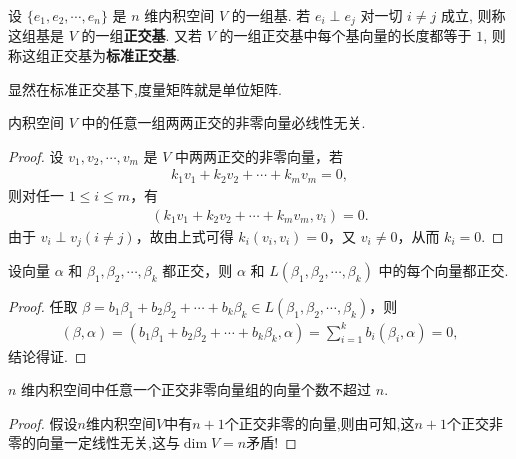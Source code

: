 \documentclass[../../main.tex]{subfiles}%
\begin{document}
\begin{definition}
设 $\{e_1, e_2, \cdots, e_n\}$ 是 $n$ 维内积空间 $V$ 的一组基. 若 $e_i \perp e_j$ 对一切 $i \neq j$ 成立, 则称这组基是 $V$ 的一组\textbf{正交基}. 又若 $V$ 的一组正交基中每个基向量的长度都等于 $1$, 则称这组正交基为\textbf{标准正交基}.
\end{definition}
\begin{note}
显然在标准正交基下,度量矩阵就是单位矩阵.
\end{note}

\begin{lemma}\label{lemma:正交向量组必线性无关}
内积空间 $V$ 中的任意一组两两正交的非零向量必线性无关.
\end{lemma}
\begin{proof}

设 $v_1, v_2, \cdots, v_m$ 是 $V$ 中两两正交的非零向量，若
\begin{align*}
k_1v_1 + k_2v_2 + \cdots + k_mv_m = 0,
\end{align*}
则对任一 $1 \leqslant  i \leqslant  m$，有
\begin{align*}
(k_1v_1 + k_2v_2 + \cdots + k_mv_m, v_i) = 0.
\end{align*}
由于 $v_i \perp v_j (i \neq j)$，故由上式可得 $k_i(v_i, v_i) = 0$，又 $v_i \neq 0$，从而 $k_i = 0$.

\end{proof}

\begin{lemma}\label{lemma:和基正交的向量一定和由基生成的空间正交}
设向量 $\alpha$ 和 $\beta_1, \beta_2, \cdots, \beta_k$ 都正交，则 $\alpha$ 和 $L(\beta_1, \beta_2, \cdots, \beta_k)$ 中的每个向量都正交.
\end{lemma}
\begin{proof}

任取 $\beta = b_1\beta_1 + b_2\beta_2 + \cdots + b_k\beta_k \in L(\beta_1, \beta_2, \cdots, \beta_k)$，则
\begin{align*}
(\beta, \alpha) = (b_1\beta_1 + b_2\beta_2 + \cdots + b_k\beta_k, \alpha) = \sum_{i = 1}^{k}b_i(\beta_i, \alpha) = 0,
\end{align*}
结论得证.

\end{proof}

\begin{corollary}
$n$ 维内积空间中任意一个正交非零向量组的向量个数不超过 $n$.
\end{corollary}
\begin{proof}

假设$n$维内积空间$V$中有$n+1$个正交非零的向量,则由可知,这$n+1$个正交非零的向量一定线性无关,这与$\dim V=n$矛盾!

\end{proof}
\end{document}
